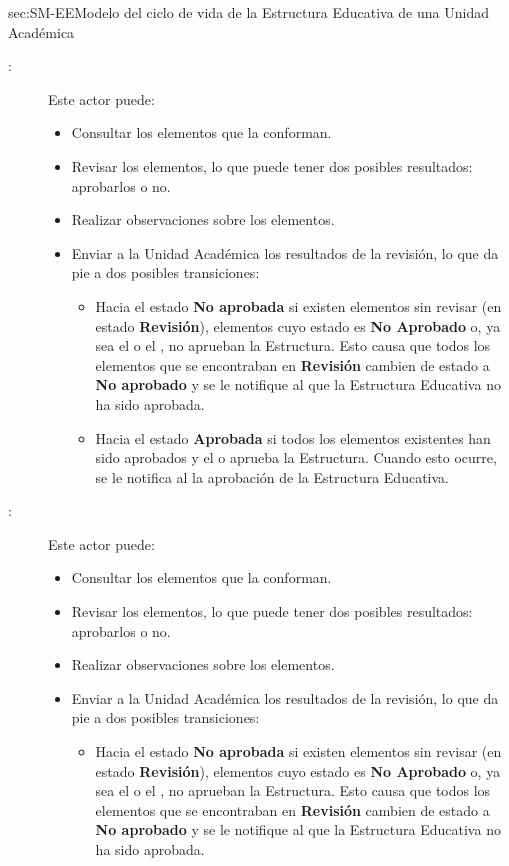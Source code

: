 \begin{Maquina}{sec:SM-EE}{Modelo del ciclo de vida de la Estructura Educativa de una Unidad Académica}
\begin{description}
\begin{description}
	\item[:] Este actor puede:
	\begin{itemize} 
		\item Consultar los elementos que la conforman.
		\item Revisar los elementos, lo que puede tener dos posibles resultados: aprobarlos o no.
		\item Realizar observaciones sobre los elementos.
		\item Enviar a la Unidad Académica los resultados de la revisión, lo que da pie a dos posibles transiciones:
		\begin{itemize} 
			\item Hacia el estado {\bf No aprobada} si existen elementos sin revisar (en estado {\bf Revisión}), elementos cuyo estado es {\bf No Aprobado} o, ya sea el  o el , no aprueban la Estructura. Esto causa que todos los elementos que se encontraban en {\bf Revisión} cambien de estado a {\bf No aprobado} y se le notifique al  que la Estructura Educativa no ha sido aprobada.
			
			\item Hacia el estado {\bf Aprobada} si todos los elementos existentes han sido aprobados y el  o  aprueba la Estructura. Cuando esto ocurre, se le notifica al  la aprobación de la Estructura Educativa.
		\end{itemize}
	\end{itemize}
	
	\item[:] Este actor puede:
	\begin{itemize} 
		\item Consultar los elementos que la conforman.
		\item Revisar los elementos, lo que puede tener dos posibles resultados: aprobarlos o no.
		\item Realizar observaciones sobre los elementos.
		\item Enviar a la Unidad Académica los resultados de la revisión, lo que da pie a dos posibles transiciones:
		\begin{itemize} 
			\item Hacia el estado {\bf No aprobada} si existen elementos sin revisar (en estado {\bf Revisión}), elementos cuyo estado es {\bf No Aprobado} o, ya sea el  o el , no aprueban la Estructura. Esto causa que todos los elementos que se encontraban en {\bf Revisión} cambien de estado a {\bf No aprobado} y se le notifique al  que la Estructura Educativa no ha sido aprobada.
			

\end{itemize}
\end{itemize}
\end{description}
\end{description}
\end{Maquina}
